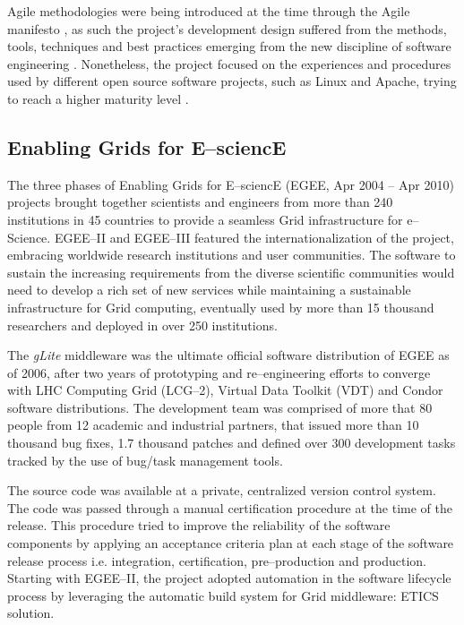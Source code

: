\documentclass[journal]{IEEEtran}
\begin{document}
Agile methodologies were being introduced at the time
through the Agile manifesto \cite{agile-manifesto}, as such the project's
development design suffered from the methods, tools, techniques and best
practices emerging from the new discipline of software engineering
\cite{agile}. Nonetheless, the project focused on the experiences and procedures
used by different open source software projects, such as Linux and Apache, trying to reach a
higher maturity level \cite{cmm}.

\subsection{Enabling Grids for E--sciencE}

The three phases of Enabling Grids for E--sciencE (EGEE, Apr 2004 -- Apr 2010)
\cite{cordis:egee, cordis:egee2, cordis:egee3} projects brought together
scientists and engineers from more than 240 institutions in 45 countries to
provide a seamless Grid infrastructure for e--Science. EGEE--II and EGEE--III
featured the internationalization of the project, embracing worldwide research
institutions and user communities. The software to sustain the increasing
requirements from the diverse scientific communities would need to develop a
rich set of new services while maintaining a sustainable infrastructure for
Grid computing, eventually used by more than 15 thousand researchers and deployed in
over 250 institutions.

The {\sl gLite} middleware \cite{glite} was the ultimate
official software distribution of EGEE as of 2006, after two years of prototyping and
re--engineering efforts to converge with LHC Computing Grid (LCG--2), Virtual
Data Toolkit (VDT) and Condor \cite{condor} software distributions. The
development team was comprised of more that 80 people from 12 academic and
industrial partners, that issued more than 10 thousand bug fixes, 1.7 thousand patches and
defined over 300 development tasks tracked by the use of bug/task management tools.

The source code was available at a private, centralized version control system.
The code was passed through a manual certification procedure at the time of the release. 
This procedure tried to improve the reliability of the software components by applying an
acceptance criteria plan at each stage of the software release process 
\cite{egee:acceptance-criteria} i.e. integration, certification, pre--production and 
production. Starting with EGEE--II, the project adopted automation in the software
lifecycle process by leveraging the automatic build system for Grid middleware: ETICS 
\cite{etics} solution.
\end{document}
